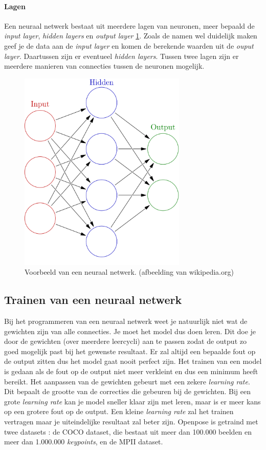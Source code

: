 \documentclass[a4paper,twoside,kulak]{kulakreport}
\begin{document}
\paragraph{Lagen}
Een neuraal netwerk bestaat uit meerdere lagen van neuronen, meer bepaald de \emph{input layer}, \emph{hidden layers} en \emph{output layer} \ref{netwerk}. Zoals de namen wel duidelijk maken geef je de data aan de \emph{input layer} en komen de berekende waarden uit de \emph{ouput layer}. Daartussen zijn er eventueel \emph{hidden layers}. Tussen twee lagen zijn er meerdere manieren van connecties tussen de neuronen mogelijk.

\begin{figure}
	\begin{center}
		\includegraphics[width=8cm]{netwerk.png}
	\end{center}
	\caption{Voorbeeld van een neuraal netwerk. (afbeelding van wikipedia.org)}
	\label{netwerk}
\end{figure}

\subsection{Trainen van een neuraal netwerk}
Bij het programmeren van een neuraal netwerk weet je natuurlijk niet wat de gewichten zijn van alle connecties. Je moet het model dus doen leren. Dit doe je door de gewichten (over meerdere leercycli) aan te passen zodat de output zo goed mogelijk past bij het gewenste resultaat. Er zal altijd een bepaalde fout op de output zitten dus het model gaat nooit perfect zijn. Het trainen van een model is gedaan als de fout op de output niet meer verkleint en dus een minimum heeft bereikt. Het aanpassen van de gewichten gebeurt met een zekere \emph{learning rate}. Dit bepaalt de grootte van de correcties die gebeuren bij de gewichten. Bij een grote \emph{learning rate} kan je model sneller klaar zijn met leren, maar is er meer kans op een grotere fout op de output. Een kleine \emph{learning rate} zal het trainen vertragen maar je uiteindelijke resultaat zal beter zijn. Openpose is getraind met twee datasets \cite{openpose}: de COCO dataset, die bestaat uit meer dan 100.000 beelden en meer dan 1.000.000 \emph{keypoints}, en de MPII dataset.
\end{document}
